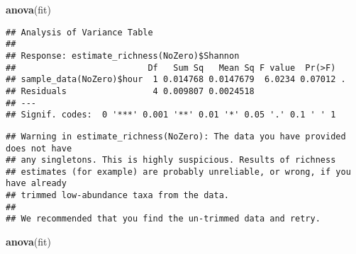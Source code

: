 \documentclass[]{article}
\newenvironment{Shaded}{\begin{snugshade}}{\end{snugshade}}
\newcommand{\KeywordTok}[1]{\textcolor[rgb]{0.13,0.29,0.53}{\textbf{#1}}}
\newcommand{\StringTok}[1]{\textcolor[rgb]{0.31,0.60,0.02}{#1}}
\newcommand{\CommentTok}[1]{\textcolor[rgb]{0.56,0.35,0.01}{\textit{#1}}}
\newcommand{\OperatorTok}[1]{\textcolor[rgb]{0.81,0.36,0.00}{\textbf{#1}}}
\newcommand{\NormalTok}[1]{#1}
\begin{document}
\begin{Shaded}
\begin{Highlighting}[]
\KeywordTok{anova}\NormalTok{(fit)}
\end{Highlighting}
\end{Shaded}

\begin{verbatim}
## Analysis of Variance Table
## 
## Response: estimate_richness(NoZero)$Shannon
##                          Df   Sum Sq   Mean Sq F value  Pr(>F)  
## sample_data(NoZero)$hour  1 0.014768 0.0147679  6.0234 0.07012 .
## Residuals                 4 0.009807 0.0024518                  
## ---
## Signif. codes:  0 '***' 0.001 '**' 0.01 '*' 0.05 '.' 0.1 ' ' 1
\end{verbatim}

\begin{Shaded}
\end{Shaded}

\begin{verbatim}
## Warning in estimate_richness(NoZero): The data you have provided does not have
## any singletons. This is highly suspicious. Results of richness
## estimates (for example) are probably unreliable, or wrong, if you have already
## trimmed low-abundance taxa from the data.
## 
## We recommended that you find the un-trimmed data and retry.
\end{verbatim}

\begin{Shaded}
\begin{Highlighting}[]
\KeywordTok{anova}\NormalTok{(fit)}
\end{Highlighting}
\end{Shaded}
\end{document}
